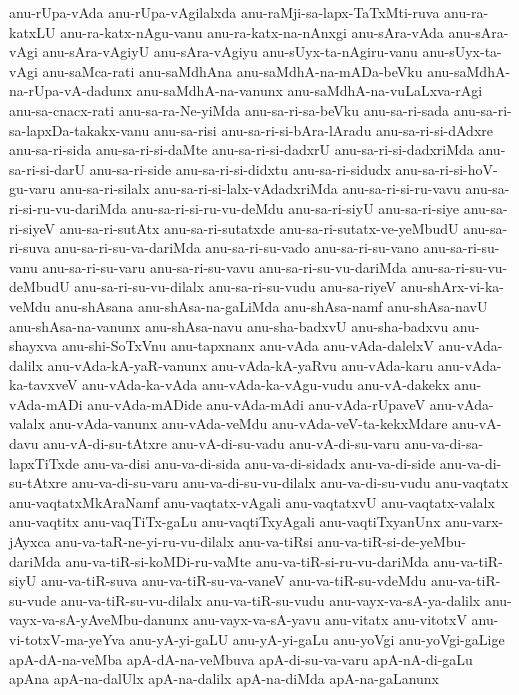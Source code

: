{anu-rUpa-vAda
anu-rUpa-vAgilalxda
anu-raMji-sa-lapx-TaTxMti-ruva
anu-ra-katxLU
anu-ra-katx-nAgu-vanu
anu-ra-katx-na-nAnxgi
anu-sAra-vAda
anu-sAra-vAgi
anu-sAra-vAgiyU
anu-sAra-vAgiyu
anu-sUyx-ta-nAgiru-vanu
anu-sUyx-ta-vAgi
anu-saMca-rati
anu-saMdhAna
anu-saMdhA-na-mADa-beVku
anu-saMdhA-na-rUpa-vA-dadunx
anu-saMdhA-na-vanunx
anu-saMdhA-na-vuLaLxva-rAgi
anu-sa-cnacx-rati
anu-sa-ra-Ne-yiMda
anu-sa-ri-sa-beVku
anu-sa-ri-sada
anu-sa-ri-sa-lapxDa-takakx-vanu
anu-sa-risi
anu-sa-ri-si-bAra-lAradu
anu-sa-ri-si-dAdxre
anu-sa-ri-sida
anu-sa-ri-si-daMte
anu-sa-ri-si-dadxrU
anu-sa-ri-si-dadxriMda
anu-sa-ri-si-darU
anu-sa-ri-side
anu-sa-ri-si-didxtu
anu-sa-ri-sidudx
anu-sa-ri-si-hoV-gu-varu
anu-sa-ri-silalx
anu-sa-ri-si-lalx-vAdadxriMda
anu-sa-ri-si-ru-vavu
anu-sa-ri-si-ru-vu-dariMda
anu-sa-ri-si-ru-vu-deMdu
anu-sa-ri-siyU
anu-sa-ri-siye
anu-sa-ri-siyeV
anu-sa-ri-sutAtx
anu-sa-ri-sutatxde
anu-sa-ri-sutatx-ve-yeMbudU
anu-sa-ri-suva
anu-sa-ri-su-va-dariMda
anu-sa-ri-su-vado
anu-sa-ri-su-vano
anu-sa-ri-su-vanu
anu-sa-ri-su-varu
anu-sa-ri-su-vavu
anu-sa-ri-su-vu-dariMda
anu-sa-ri-su-vu-deMbudU
anu-sa-ri-su-vu-dilalx
anu-sa-ri-su-vudu
anu-sa-riyeV
anu-shArx-vi-ka-veMdu
anu-shAsana
anu-shAsa-na-gaLiMda
anu-shAsa-namf
anu-shAsa-navU
anu-shAsa-na-vanunx
anu-shAsa-navu
anu-sha-badxvU
anu-sha-badxvu
anu-shayxva
anu-shi-SoTxVnu
anu-tapxnanx
anu-vAda
anu-vAda-dalelxV
anu-vAda-dalilx
anu-vAda-kA-yaR-vanunx
anu-vAda-kA-yaRvu
anu-vAda-karu
anu-vAda-ka-tavxveV
anu-vAda-ka-vAda
anu-vAda-ka-vAgu-vudu
anu-vA-dakekx
anu-vAda-mADi
anu-vAda-mADide
anu-vAda-mAdi
anu-vAda-rUpaveV
anu-vAda-valalx
anu-vAda-vanunx
anu-vAda-veMdu
anu-vAda-veV-ta-kekxMdare
anu-vA-davu
anu-vA-di-su-tAtxre
anu-vA-di-su-vadu
anu-vA-di-su-varu
anu-va-di-sa-lapxTiTxde
anu-va-disi
anu-va-di-sida
anu-va-di-sidadx
anu-va-di-side
anu-va-di-su-tAtxre
anu-va-di-su-varu
anu-va-di-su-vu-dilalx
anu-va-di-su-vudu
anu-vaqtatx
anu-vaqtatxMkAraNamf
anu-vaqtatx-vAgali
anu-vaqtatxvU
anu-vaqtatx-valalx
anu-vaqtitx
anu-vaqTiTx-gaLu
anu-vaqtiTxyAgali
anu-vaqtiTxyanUnx
anu-varx-jAyxca
anu-va-taR-ne-yi-ru-vu-dilalx
anu-va-tiRsi
anu-va-tiR-si-de-yeMbu-dariMda
anu-va-tiR-si-koMDi-ru-vaMte
anu-va-tiR-si-ru-vu-dariMda
anu-va-tiR-siyU
anu-va-tiR-suva
anu-va-tiR-su-va-vaneV
anu-va-tiR-su-vdeMdu
anu-va-tiR-su-vude
anu-va-tiR-su-vu-dilalx
anu-va-tiR-su-vudu
anu-vayx-va-sA-ya-dalilx
anu-vayx-va-sA-yAveMbu-danunx
anu-vayx-va-sA-yavu
anu-vitatx
anu-vitotxV
anu-vi-totxV-ma-yeYva
anu-yA-yi-gaLU
anu-yA-yi-gaLu
anu-yoVgi
anu-yoVgi-gaLige
apA-dA-na-veMba
apA-dA-na-veMbuva
apA-di-su-va-varu
apA-nA-di-gaLu
apAna
apA-na-dalUlx
apA-na-dalilx
apA-na-diMda
apA-na-gaLanunx
}
